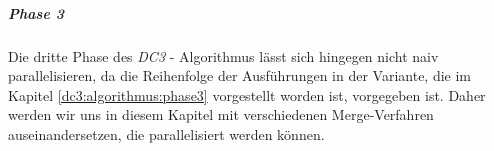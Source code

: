 \subparagraph*{Phase 3}

Die dritte Phase des \emph{DC3} - Algorithmus lässt sich hingegen nicht naiv parallelisieren, da die Reihenfolge der Ausführungen in der Variante, die im Kapitel \ref{dc3:algorithmus:phase3} vorgestellt worden ist, vorgegeben ist.
Daher werden wir uns in diesem Kapitel mit verschiedenen Merge-Verfahren auseinandersetzen, die parallelisiert werden können.







